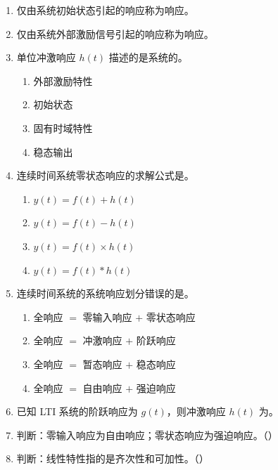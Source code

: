 \documentclass[12pt,a4paper]{ctexart}
\begin{document}
\begin{enumerate}[label=\arabic*.]
\item 仅由系统初始状态引起的响应称为\underline{\hspace{2cm}}响应。

\item 仅由系统外部激励信号引起的响应称为\underline{\hspace{2cm}}响应。

\item 单位冲激响应 $h(t)$ 描述的是系统的\underline{\hspace{2cm}}。
\begin{enumerate}[label=\Alph*.]
\item 外部激励特性
\item 初始状态
\item 固有时域特性
\item 稳态输出
\end{enumerate}

\item 连续时间系统零状态响应的求解公式是\underline{\hspace{2cm}}。
\begin{enumerate}[label=\Alph*.]
\item $y(t)=f(t)+h(t)$
\item $y(t)=f(t)-h(t)$
\item $y(t)=f(t)\times h(t)$
\item $y(t)=f(t)*h(t)$
\end{enumerate}

\item 连续时间系统的系统响应划分错误的是\underline{\hspace{2cm}}。
\begin{enumerate}[label=\Alph*.]
\item 全响应 $=$ 零输入响应 $+$ 零状态响应
\item 全响应 $=$ 冲激响应 $+$ 阶跃响应
\item 全响应 $=$ 暂态响应 $+$ 稳态响应
\item 全响应 $=$ 自由响应 $+$ 强迫响应
\end{enumerate}

\item 已知 LTI 系统的阶跃响应为 $g(t)$，则冲激响应 $h(t)$ 为\underline{\hspace{2cm}}。

\item 判断：零输入响应为自由响应；零状态响应为强迫响应。\quad（\qquad）

\item 判断：线性特性指的是齐次性和可加性。\quad（\qquad）
\end{enumerate}
\end{document}
